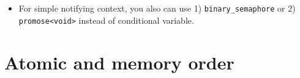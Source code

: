 \documentclass[a4paper,11pt,twoside]{book}
\begin{document}
\begin{itemize}
\begin{lstlisting}[numbers=none]
	product = "  " + name + " cleaned\n";
	std::cout << product;
	sync_point.arrive_and_wait();
};
std::cout << "Starting...\n";
std::vector<std::thread> threads;
for (auto const& worker : workers) {
	threads.emplace_back(work, worker);
}
for (auto& thread : threads) { thread.join();}	
//output
Starting...
anil worked
carl worked
... done  //the first time go into the on_completion
Cleaning up...
busara cleaned
carl cleaned
... done  //the second time go into the on_completion
\end{lstlisting}

    \item For simple notifying context, you also can use 1) \texttt{binary\_semaphore} or 2) \texttt{promose<void>} instead of conditional variable.

\end{itemize}


\section{Atomic and memory order}
\end{document}
